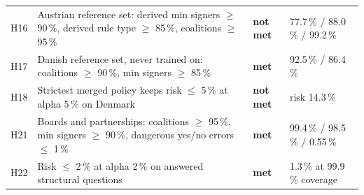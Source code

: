 \begin{tabular}{@{}lp{6.2cm}lp{4.6cm}@{}}
H16 & Austrian reference set: derived min signers $\ge$ 90\,\%, derived rule type $\ge$ 85\,\%, coalitions $\ge$ 95\,\% & \textbf{not met} & 77.7\,\% / 88.0\,\% / 99.2\,\% \\
H17 & Danish reference set, never trained on: coalitions $\ge$ 90\,\%, min signers $\ge$ 85\,\% & \textbf{met} & 92.5\,\% / 86.4\,\% \\
H18 & Strictest merged policy keeps risk $\le$ 5\,\% at alpha 5\,\% on Denmark & \textbf{not met} & risk 14.3\,\% \\
H21 & Boards and partnerships: coalitions $\ge$ 95\,\%, min signers $\ge$ 90\,\%, dangerous yes/no errors $\le$ 1\,\% & \textbf{met} & 99.4\,\% / 98.5\,\% / 0.55\,\% \\
H22 & Risk $\le$ 2\,\% at alpha 2\,\% on answered structural questions & \textbf{met} & 1.3\,\% at 99.9\,\% coverage \\
\bottomrule
\end{tabular}
